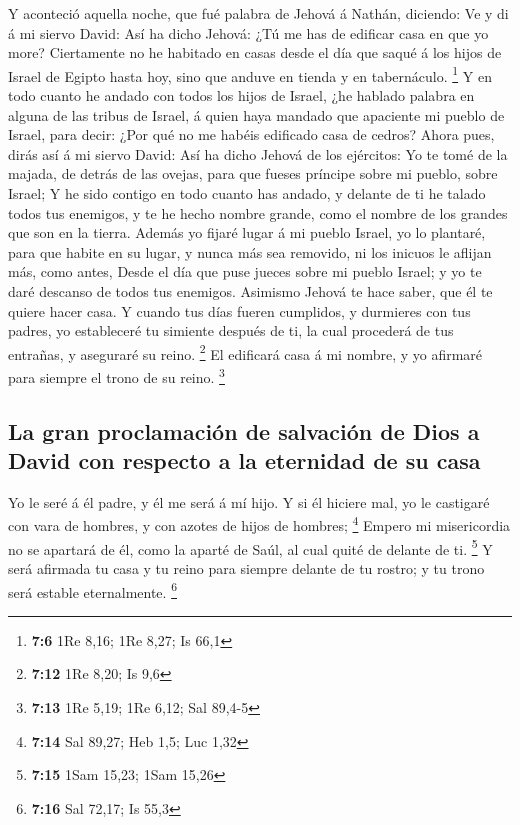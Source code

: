  Y aconteció aquella noche, que fué palabra de Jehová á
Nathán, diciendo:  Ve y di á mi siervo David: Así ha dicho
Jehová: ¿Tú me has de edificar casa en que yo more? 
Ciertamente no he habitado en casas desde el día que saqué á los hijos
de Israel de Egipto hasta hoy, sino que anduve en tienda y en
tabernáculo. \footnote{\textbf{7:6} 1Re 8,16; 1Re 8,27; Is 66,1}
 Y en todo cuanto he andado con todos los hijos de Israel,
¿he hablado palabra en alguna de las tribus de Israel, á quien haya
mandado que apaciente mi pueblo de Israel, para decir: ¿Por qué no me
habéis edificado casa de cedros?  Ahora pues, dirás así á mi
siervo David: Así ha dicho Jehová de los ejércitos: Yo te tomé de la
majada, de detrás de las ovejas, para que fueses príncipe sobre mi
pueblo, sobre Israel;  Y he sido contigo en todo cuanto has
andado, y delante de ti he talado todos tus enemigos, y te he hecho
nombre grande, como el nombre de los grandes que son en la tierra.
 Además yo fijaré lugar á mi pueblo Israel, yo lo plantaré,
para que habite en su lugar, y nunca más sea removido, ni los inicuos le
aflijan más, como antes,  Desde el día que puse jueces
sobre mi pueblo Israel; y yo te daré descanso de todos tus enemigos.
Asimismo Jehová te hace saber, que él te quiere hacer casa.
 Y cuando tus días fueren cumplidos, y durmieres con tus
padres, yo estableceré tu simiente después de ti, la cual procederá de
tus entrañas, y aseguraré su reino. \footnote{\textbf{7:12} 1Re 8,20; Is
  9,6}  El edificará casa á mi nombre, y yo afirmaré para
siempre el trono de su reino. \footnote{\textbf{7:13} 1Re 5,19; 1Re
  6,12; Sal 89,4-5}

\hypertarget{la-gran-proclamaciuxf3n-de-salvaciuxf3n-de-dios-a-david-con-respecto-a-la-eternidad-de-su-casa}{%
\subsection{La gran proclamación de salvación de Dios a David con
respecto a la eternidad de su
casa}\label{la-gran-proclamaciuxf3n-de-salvaciuxf3n-de-dios-a-david-con-respecto-a-la-eternidad-de-su-casa}}

 Yo le seré á él padre, y él me será á mí hijo. Y si él
hiciere mal, yo le castigaré con vara de hombres, y con azotes de hijos
de hombres; \footnote{\textbf{7:14} Sal 89,27; Heb 1,5; Luc 1,32}
 Empero mi misericordia no se apartará de él, como la
aparté de Saúl, al cual quité de delante de ti. \footnote{\textbf{7:15}
  1Sam 15,23; 1Sam 15,26}  Y será afirmada tu casa y tu
reino para siempre delante de tu rostro; y tu trono será estable
eternalmente. \footnote{\textbf{7:16} Sal 72,17; Is 55,3}


